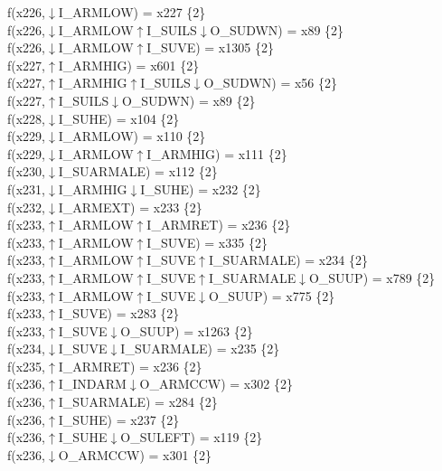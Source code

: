 f(x226,$\downarrow$I\_ARMLOW) = x227 \{2\} \\  
f(x226,$\downarrow$I\_ARMLOW$\uparrow$I\_SUILS$\downarrow$O\_SUDWN) = x89 \{2\} \\  
f(x226,$\downarrow$I\_ARMLOW$\uparrow$I\_SUVE) = x1305 \{2\} \\  
f(x227,$\uparrow$I\_ARMHIG) = x601 \{2\} \\  
f(x227,$\uparrow$I\_ARMHIG$\uparrow$I\_SUILS$\downarrow$O\_SUDWN) = x56 \{2\} \\  
f(x227,$\uparrow$I\_SUILS$\downarrow$O\_SUDWN) = x89 \{2\} \\  
f(x228,$\downarrow$I\_SUHE) = x104 \{2\} \\  
f(x229,$\downarrow$I\_ARMLOW) = x110 \{2\} \\  
f(x229,$\downarrow$I\_ARMLOW$\uparrow$I\_ARMHIG) = x111 \{2\} \\  
f(x230,$\downarrow$I\_SUARMALE) = x112 \{2\} \\  
f(x231,$\downarrow$I\_ARMHIG$\downarrow$I\_SUHE) = x232 \{2\} \\  
f(x232,$\downarrow$I\_ARMEXT) = x233 \{2\} \\  
f(x233,$\uparrow$I\_ARMLOW$\uparrow$I\_ARMRET) = x236 \{2\} \\  
f(x233,$\uparrow$I\_ARMLOW$\uparrow$I\_SUVE) = x335 \{2\} \\  
f(x233,$\uparrow$I\_ARMLOW$\uparrow$I\_SUVE$\uparrow$I\_SUARMALE) = x234 \{2\} \\  
f(x233,$\uparrow$I\_ARMLOW$\uparrow$I\_SUVE$\uparrow$I\_SUARMALE$\downarrow$O\_SUUP) = x789 \{2\} \\  
f(x233,$\uparrow$I\_ARMLOW$\uparrow$I\_SUVE$\downarrow$O\_SUUP) = x775 \{2\} \\  
f(x233,$\uparrow$I\_SUVE) = x283 \{2\} \\  
f(x233,$\uparrow$I\_SUVE$\downarrow$O\_SUUP) = x1263 \{2\} \\  
f(x234,$\downarrow$I\_SUVE$\downarrow$I\_SUARMALE) = x235 \{2\} \\  
f(x235,$\uparrow$I\_ARMRET) = x236 \{2\} \\  
f(x236,$\uparrow$I\_INDARM$\downarrow$O\_ARMCCW) = x302 \{2\} \\  
f(x236,$\uparrow$I\_SUARMALE) = x284 \{2\} \\  
f(x236,$\uparrow$I\_SUHE) = x237 \{2\} \\  
f(x236,$\uparrow$I\_SUHE$\downarrow$O\_SULEFT) = x119 \{2\} \\  
f(x236,$\downarrow$O\_ARMCCW) = x301 \{2\} \\  
